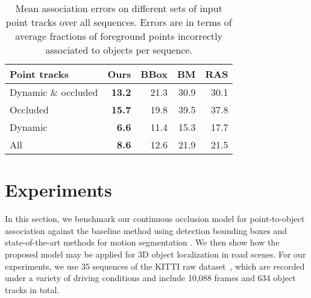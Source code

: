 \begin{wraptable}[8]{r}{0.5\textwidth}\scriptsize\centering
\begin{tabular}{lrrrr}
  \toprule
  Point tracks & Ours & BBox & BM & RAS\\
  \midrule
  Dynamic \& occluded         & \textbf{13.2} & 21.3 & 30.9 & 30.1 \\
  Occluded		              & \textbf{15.7} & 19.8 & 39.5 & 37.8 \\
  Dynamic		              & \textbf{6.6} & 11.4 & 15.3 & 17.7 \\
  All		                  & \textbf{8.6} & 12.6 & 21.9 & 21.5 \\
  \bottomrule
\end{tabular}
\caption{Mean association errors on different sets of input point tracks over all sequences. Errors are in terms of average fractions of foreground points incorrectly associated to objects per sequence.}
\label{tab:meanAssoc}
\end{wraptable}
%
\section{Experiments}
\label{sec:experiments}

In this section, we benchmark our continuous occlusion model for point-to-object association against the baseline method using detection bounding boxes and state-of-the-art methods for motion segmentation \cite{Brox_Malik_2010,Rao_etal_2010}. We then show how the proposed model may be applied for 3D object localization in road scenes. For our experiments, we use 35 sequences of the KITTI raw dataset~\cite{Geiger_etal_2012}, which are recorded under a variety of driving conditions and include 10,088 frames and 634 object tracks in total. 



